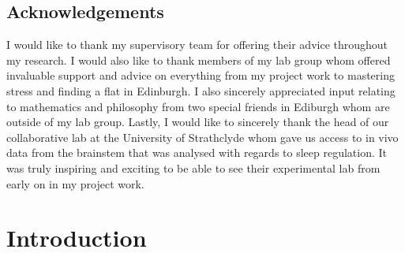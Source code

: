 \documentclass[mphil,deptreport,ianc]{infthesis} %
\begin{document}
\begin{preliminary}
\section*{Acknowledgements}

I would like to thank my supervisory team for offering their advice throughout my research.
I would also like to thank members of my lab group whom offered invaluable support and advice on everything from my project work to mastering stress and finding a flat in Edinburgh.
I also sincerely appreciated input relating to mathematics and philosophy from two special friends in Ediburgh whom are outside of my lab group.
Lastly, I would like to sincerely thank the head of our collaborative lab at the University of Strathclyde whom gave us access to in vivo data from the brainstem that was analysed with regards to sleep regulation. It was truly inspiring and exciting to be able to see their experimental lab from early on in my project work.


\tableofcontents
\end{preliminary}


\chapter{Introduction}




\end{document}
